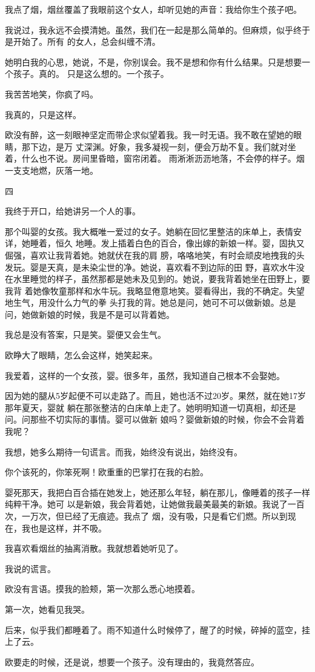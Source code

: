 \documentclass[12pt,a4paper]{article}
\newcommand{\subpart}[1]{
	\begingroup \par
	\vspace{1ex} \centering #1
	\par \endgroup \nopagebreak[4]
}
\begin{document}
		我点了烟，烟丝覆盖了我眼前这个女人，却听见她的声音：我给你生个孩子吧。

		我说过，我永远不会摸清她。虽然，我们在一起是那么简单的。但麻烦，似乎终于是开始了。所有
	的女人，总会纠缠不清。

		她明白我的心思，她说，不是，你别误会。我不是想和你有什么结果。只是想要一个孩子。真的。
	只是这么想的。一个孩子。

		我苦苦地笑，你疯了吗。\par
		我真的，只是这样。

		欧没有醉，这一刻眼神坚定而带企求似望着我。我一时无语。我不敢在望她的眼睛，那下边，是万
	丈深渊。好象，我多凝视一刻，便会万劫不复。我们就对坐着，什么也不说。房间里昏暗，窗帘闭着。
	雨淅淅沥沥地落，不会停的样子。烟一支支地燃，灰落一地。

		\subpart{四}

		我终于开口，给她讲另一个人的事。

		那个叫婴的女孩。我大概唯一爱过的女子。她躺在回忆里整洁的床单上，表情安详，她睡着，恒久
	地睡。发上插着白色的百合，像出嫁的新娘一样。婴，固执又倔强，喜欢让我背着她。她就伏在我的肩
	膀，咯咯地笑，有时会顽皮地拽我的头发玩。婴是天真，是未染尘世的净。她说，喜欢看不到边际的田
	野，喜欢水牛没在水里睡觉的样子，虽然那都是她未及见到的。她说，要我背着她坐在田野上，要我背
	着她像牧童那样和水牛玩。我略显倦意地笑。婴看得出，我的不确定。失望地生气，用没什么力气的拳
	头打我的背。她总是问，她可不可以做新娘。总是问，她做新娘的时候，我是不是可以背着她。

		我总是没有答案，只是笑。婴便又会生气。\par
		欧睁大了眼睛，怎么会这样，她笑起来。\par
		我爱着，这样的一个女孩，婴。很多年，虽然，我知道自己根本不会娶她。

		因为她的腿从5岁起便不可以走路了。而且，她也活不过20岁。果然，就在她17岁那年夏天，婴就
	躺在那张整洁的白床单上走了。她明明知道一切真相，却还是问。问那些不切实际的事情。婴可以做新
	娘吗？婴做新娘的时候，你会不会背着我呢？

		我想，她多么期待一句谎言。而我，始终没有说出，始终没有。\par
		你个该死的，你笨死啊！欧重重的巴掌打在我的右脸。

		婴死那天，我把白百合插在她发上，她还那么年轻，躺在那儿，像睡着的孩子一样纯粹干净。她可
	以是新娘，我会背着她，让她做我最美最美的新娘。我说了一百次，一万次，但已经了无痕迹。我点了
	烟，没有吸，只是看它们燃。所以到现在，我也是这样，并不吸。

		我喜欢看烟丝的抽离消散。我就想着她听见了。\par
		我说的谎言。\par
		欧没有言语。摸我的脸颊，第一次那么悉心地摸着。\par
		第一次，她看见我哭。\par
		后来，似乎我们都睡着了。雨不知道什么时候停了，醒了的时候，碎掉的蓝空，挂上了云。\par
		欧要走的时候，还是说，想要一个孩子。没有理由的，我竟然答应。
\end{document}
